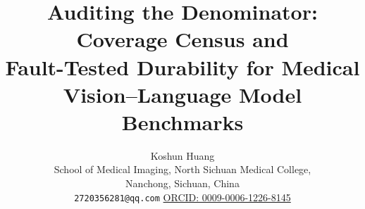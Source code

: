 \documentclass[11pt]{article}
\title{Auditing the Denominator: Coverage Census and\\
Fault-Tested Durability for Medical Vision--Language Model Benchmarks}
\author{Koshun Huang\\[2pt]
\small School of Medical Imaging, North Sichuan Medical College,\\
\small Nanchong, Sichuan, China\\[1pt]
\small \texttt{2720356281@qq.com}\quad
\href{https://orcid.org/0009-0006-1226-8145}{ORCID: 0009-0006-1226-8145}}
\date{}
\begin{document}
\maketitle

\begin{abstract}

\end{abstract}













\FloatBarrier



\appendix

\end{document}
